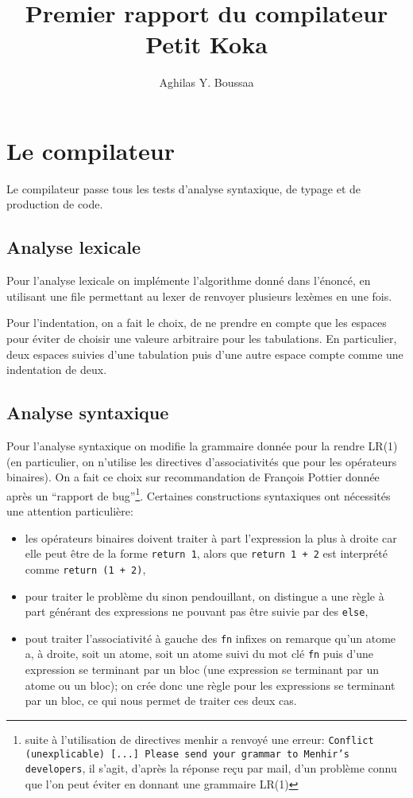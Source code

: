 \documentclass[11pt]{article}
\author{Aghilas Y. Boussaa}
\title{Premier rapport du compilateur \textsf{Petit Koka}}
\begin{document}
\maketitle
\section{Le compilateur}
Le compilateur passe tous les tests d'analyse syntaxique, de typage et de
production de code.

\subsection{Analyse lexicale}
Pour l'analyse lexicale on implémente l'algorithme donné
dans l'énoncé, en utilisant une file permettant au lexer de renvoyer plusieurs
lexèmes en une fois.

Pour l'indentation, on a fait le choix, de ne prendre en compte que les espaces
pour éviter de choisir une valeure arbitraire pour les tabulations. En
particulier, deux espaces suivies d'une tabulation puis d'une autre espace
compte comme une indentation de deux.

\subsection{Analyse syntaxique}
Pour l'analyse syntaxique on modifie la grammaire donnée pour la rendre LR(1)
(en particulier, on n'utilise les directives d'associativités que pour les
opérateurs binaires). On a fait ce choix sur recommandation de François Pottier
donnée après un ``rapport de bug''\footnote{suite à l'utilisation de directives
menhir a renvoyé une erreur: \texttt{Conflict (unexplicable) [...] Please send
  your grammar to Menhir's developers}, il s'agit, d'après la réponse reçu par
mail, d'un problème connu que l'on peut éviter en donnant une grammaire
LR(1)}. Certaines constructions syntaxiques ont nécessités une attention
particulière:
\begin{itemize}
  \item les opérateurs binaires doivent traiter à part l'expression la plus à
    droite car elle peut être de la forme \texttt{return 1}, alors que
    \texttt{return 1 + 2} est interprété comme \texttt{return (1 + 2)},
  \item pour traiter le problème du sinon pendouillant, on distingue a une règle
    à part générant des expressions ne pouvant pas être suivie par des
    \texttt{else},
  \item pout traiter l'associativité à gauche des \texttt{fn} infixes on
    remarque qu'un atome a, à droite, soit un atome, soit un atome suivi du mot
    clé \texttt{fn} puis d'une expression se terminant par un bloc (une
    expression se terminant par un atome ou un bloc); on crée donc une règle
    pour les expressions se terminant par un bloc, ce qui nous permet de traiter
    ces deux cas.
\end{itemize}
\end{document}
